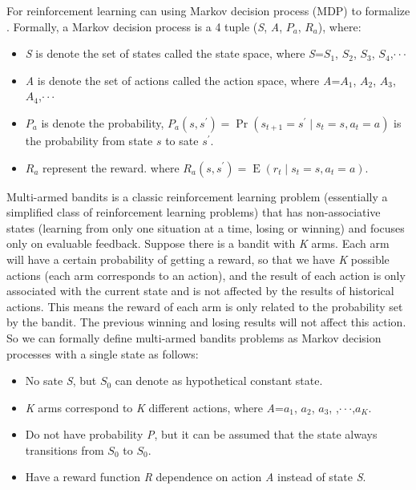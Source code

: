 For reinforcement learning can using Markov decision process (MDP) to formalize \cite{98sutton}. Formally, a Markov decision process is a 4 tuple (\textit{S}, \textit{A}, \textit{$P_{a}$}, \textit{$R_{a}$}), where:
\begin{itemize}
    \item \textit{S} is denote the set of states called the state space, where \textit{S}={\textit{$S_{1}$}, \textit{$S_{2}$}, \textit{$S_{3}$}, \textit{$S_{4}$},$\cdot \cdot \cdot$}
    
    \item \textit{A} is denote the set of actions called the action space, where \textit{A}={\textit{$A_{1}$}, \textit{$A_{2}$}, \textit{$A_{3}$}, \textit{$A_{4}$},$\cdot \cdot \cdot$}
    
    \item \textit{$P_{a}$} is denote the probability, $P_{a}\left(s, s^{\prime}\right)=\operatorname{Pr}\left(s_{t+1}=s^{\prime} \mid s_{t}=s, a_{t}=a\right)$ is the probability from state $s$ to sate $s^{\prime}$.
    
    \item \textit{$R_{a}$} represent the reward. where $R_{a}\left(s, s^{\prime}\right) =\operatorname{E}\left(r_{t} \mid s_{t}=s, a_{t}=a\right)$.
\end{itemize}

Multi-armed bandits is a classic reinforcement learning problem (essentially a simplified class of reinforcement learning problems) that has non-associative states (learning from only one situation at a time, losing or winning) and focuses only on evaluable feedback. Suppose there is a bandit with \textit{K} arms. Each arm will have a certain probability of getting a reward, so that we have \textit{K} possible actions (each arm corresponds to an action), and the result of each action is only associated with the current state and is not affected by the results of historical actions. This means the reward of each arm is only related to the probability set by the bandit. The previous winning and losing results will not affect this action. So we can formally define multi-armed bandits problems as Markov decision processes with a single state as follows:

\begin{itemize}
    \item No sate \textit{S}, but \textit{$S_{0}$} can denote as hypothetical constant state.
    
    \item \textit{K} arms correspond to \textit{K} different actions, where \textit{A}={\textit{$a_{1}$}, \textit{$a_{2}$}, \textit{$a_{3}$}, ,$\cdot \cdot \cdot$,\textit{$a_{K}$}}.
    
    \item Do not have probability \textit{P}, but it can be assumed that the state always transitions from \textit{$S_{0}$} to \textit{$S_{0}$}.
    
    \item Have a reward function \textit{R} dependence on action \textit{A} instead of state \textit{S}.
\end{itemize}

